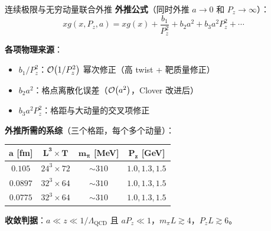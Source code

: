 \documentclass[10pt,aspectratio=169]{beamer}
\newcommand{\lqcd}{\Lambda_{\mathrm{QCD}}}
\newcommand{\Pz}{P_z}
\begin{document}
\begin{frame}{连续极限与无穷动量联合外推}
\small
\textbf{外推公式}（同时外推 $a \to 0$ 和 $\Pz \to \infty$）：
\begin{equation}
  \boxed{
  x g(x, \Pz, a) = x g(x) + \frac{b_1}{\Pz^2} + b_2 a^2 + b_3 a^2 \Pz^2 + \cdots
  }
\end{equation}

\textbf{各项物理来源}：
\begin{itemize}
  \item $b_1/\Pz^2$：$\order{1/\Pz^2}$ 幂次修正（高 twist + 靶质量修正）
  \item $b_2 a^2$：格点离散化误差（$\order{a^2}$，Clover 改进后）
  \item $b_3 a^2 \Pz^2$：格距与大动量的交叉项修正
\end{itemize}

\textbf{外推所需的系综}（三个格距，每个多个动量）：
\begin{center}
\begin{tabular}{c|c|c|c}
  \toprule
  $\bm{a}$ [fm] & $\bm{L^3 \times T}$ & $\bm{m_\pi}$ [MeV] & $\bm{\Pz}$ [GeV] \\
  \midrule
  $0.105$ & $24^3 \times 72$ & $\sim 310$ & $1.0, 1.3, 1.5$ \\
  $0.0897$ & $32^3 \times 64$ & $\sim 310$ & $1.0, 1.3, 1.5$ \\
  $0.0775$ & $32^3 \times 64$ & $\sim 310$ & $1.0, 1.3, 1.5$ \\
  \bottomrule
\end{tabular}
\end{center}

\textbf{收敛判据}：$a \ll z \ll 1/\lqcd$ 且 $a\Pz \ll 1$，$m_\pi L \gtrsim 4$，$\Pz L \gtrsim 6$。
\end{frame}
\end{document}
